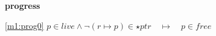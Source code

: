 \textbf{progress}
\begin{block}
\item[ \eqref{m1:prog0} ]{$p \in live \land \neg (r \mapsto p) \in \star{ptr}  \quad \mapsto\quad p \in free $} %
\end{block}
